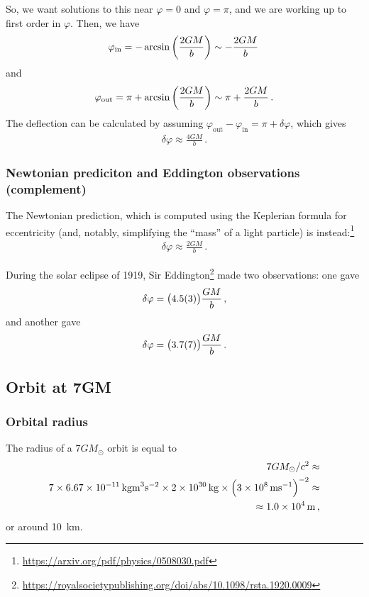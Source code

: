 \documentclass[main.tex]{subfiles}
\begin{document}
So, we want solutions to this near \(\varphi = 0\) and \(\varphi = \pi \), and we are working up to first order in \(\varphi \). Then, we have 
%
\begin{align}
  \varphi _{\text{in}} = - \arcsin \qty(\frac{2GM}{b}) 
  \sim - \frac{2GM}{b}
\,
\end{align}
%
and  
%
\begin{align}
  \varphi _{\text{out}}  = \pi + \arcsin \qty( \frac{2GM}{b}) \sim \pi + \frac{2GM}{b}
\,.
\end{align}
%
The deflection can be calculated by assuming \( \varphi _{\text{out}} - \varphi _{\text{in}} = \pi + \delta \varphi \), which gives 
%
\begin{align}
  \delta \varphi \approx \frac{4GM}{b}
\,.
\end{align}
%

\subsubsection{Newtonian prediciton and Eddington observations (complement)}

The Newtonian prediction, which is computed using the Keplerian formula for eccentricity (and, notably, simplifying the ``mass'' of a light particle) is instead:\footnote{\url{https://arxiv.org/pdf/physics/0508030.pdf}}
%
\begin{align}
  \delta \varphi \approx \frac{2GM}{b}
\,.
\end{align}

During the solar eclipse of 1919, Sir Eddington\footnote{\url{https://royalsocietypublishing.org/doi/abs/10.1098/rsta.1920.0009}} made two observations: one gave 
%
\begin{align}
  \delta \varphi = \qty(\SI{4.5(3)}{}) \frac{GM}{b}
\,,
\end{align}
%
and another gave 
%
\begin{align}
  \delta \varphi = \qty(\SI{3.7(7)}{}) \frac{GM}{b}
\,.
\end{align}
%

\subsection{Orbit at 7GM}

\subsubsection{Orbital radius}

The radius of a \(7G M_{\odot}\) orbit is equal to 
%
\begin{align}
  7GM_{\odot}/c^2 \approx\\
  7 \times \SI{6.67e-11}{kg m^{3} s^{-2}} \times \SI{2e30}{kg} \times \qty(\SI{3e8}{ms^{-1}})^{-2} \approx \\
  \approx \SI{1.0e4}{m}
\,,
\end{align}
%
or around \SI{10}{km}. 
\end{document}
